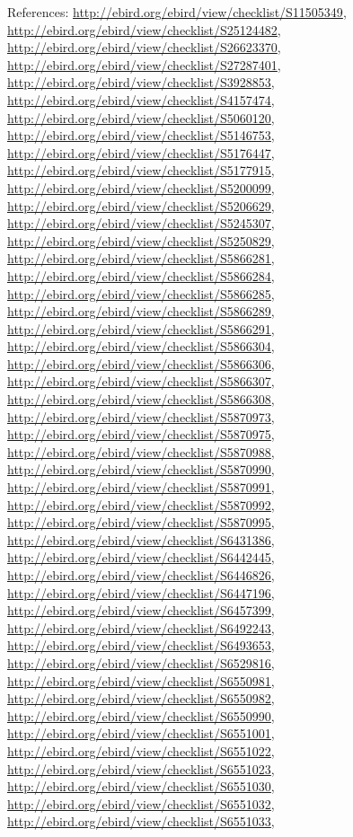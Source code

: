\documentclass[9pt, article]{memoir}
\begin{document}
\begin{multicols}{2}
\vspace{6pt}References: 
\url{http://ebird.org/ebird/view/checklist/S11505349}, 
\url{http://ebird.org/ebird/view/checklist/S25124482}, 
\url{http://ebird.org/ebird/view/checklist/S26623370}, 
\url{http://ebird.org/ebird/view/checklist/S27287401}, 
\url{http://ebird.org/ebird/view/checklist/S3928853}, 
\url{http://ebird.org/ebird/view/checklist/S4157474}, 
\url{http://ebird.org/ebird/view/checklist/S5060120}, 
\url{http://ebird.org/ebird/view/checklist/S5146753}, 
\url{http://ebird.org/ebird/view/checklist/S5176447}, 
\url{http://ebird.org/ebird/view/checklist/S5177915}, 
\url{http://ebird.org/ebird/view/checklist/S5200099}, 
\url{http://ebird.org/ebird/view/checklist/S5206629}, 
\url{http://ebird.org/ebird/view/checklist/S5245307}, 
\url{http://ebird.org/ebird/view/checklist/S5250829}, 
\url{http://ebird.org/ebird/view/checklist/S5866281}, 
\url{http://ebird.org/ebird/view/checklist/S5866284}, 
\url{http://ebird.org/ebird/view/checklist/S5866285}, 
\url{http://ebird.org/ebird/view/checklist/S5866289}, 
\url{http://ebird.org/ebird/view/checklist/S5866291}, 
\url{http://ebird.org/ebird/view/checklist/S5866304}, 
\url{http://ebird.org/ebird/view/checklist/S5866306}, 
\url{http://ebird.org/ebird/view/checklist/S5866307}, 
\url{http://ebird.org/ebird/view/checklist/S5866308}, 
\url{http://ebird.org/ebird/view/checklist/S5870973}, 
\url{http://ebird.org/ebird/view/checklist/S5870975}, 
\url{http://ebird.org/ebird/view/checklist/S5870988}, 
\url{http://ebird.org/ebird/view/checklist/S5870990}, 
\url{http://ebird.org/ebird/view/checklist/S5870991}, 
\url{http://ebird.org/ebird/view/checklist/S5870992}, 
\url{http://ebird.org/ebird/view/checklist/S5870995}, 
\url{http://ebird.org/ebird/view/checklist/S6431386}, 
\url{http://ebird.org/ebird/view/checklist/S6442445}, 
\url{http://ebird.org/ebird/view/checklist/S6446826}, 
\url{http://ebird.org/ebird/view/checklist/S6447196}, 
\url{http://ebird.org/ebird/view/checklist/S6457399}, 
\url{http://ebird.org/ebird/view/checklist/S6492243}, 
\url{http://ebird.org/ebird/view/checklist/S6493653}, 
\url{http://ebird.org/ebird/view/checklist/S6529816}, 
\url{http://ebird.org/ebird/view/checklist/S6550981}, 
\url{http://ebird.org/ebird/view/checklist/S6550982}, 
\url{http://ebird.org/ebird/view/checklist/S6550990}, 
\url{http://ebird.org/ebird/view/checklist/S6551001}, 
\url{http://ebird.org/ebird/view/checklist/S6551022}, 
\url{http://ebird.org/ebird/view/checklist/S6551023}, 
\url{http://ebird.org/ebird/view/checklist/S6551030}, 
\url{http://ebird.org/ebird/view/checklist/S6551032}, 
\url{http://ebird.org/ebird/view/checklist/S6551033}, 

\end{multicols}
\end{document}
